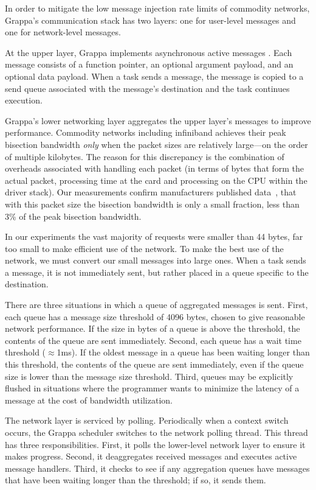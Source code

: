 In order to mitigate the low message injection rate limits of commodity networks, Grappa's communication stack has two layers: one for user-level messages and one for network-level messages.

At the upper layer, Grappa implements asynchronous active messages \cite{vonEicken92}. Each message consists of a function pointer, an optional argument payload, and an optional data payload. When a task sends a message, the message is copied to a send queue associated with the message's destination and the task continues execution.

Grappa's lower networking layer aggregates the upper layer's messages to improve performance. Commodity networks including infiniband achieves their peak bisection bandwidth \emph{only} when the packet sizes are relatively large---on the order of multiple kilobytes. The reason for this discrepancy is the combination of overheads associated with handling each packet (in terms of bytes that form the actual packet, processing time at the card and processing on the CPU within the driver stack). Our measurements confirm manufacturers published data~\cite{infinibandbandwidth}, that with this packet size the bisection bandwidth is only a small fraction, less than 3\% of the peak bisection bandwidth.

In our experiments the vast majority of requests were smaller than 44 bytes, far too small to make efficient use of the network. To make the best use of the network, we must convert our small messages into large ones. When a task sends a message, it is not immediately sent, but rather placed in a queue specific to the destination.

There are three situations in which a queue of aggregated messages is sent. First, each queue has a message size threshold of 4096 bytes, chosen to give reasonable network performance. If the size in bytes of a queue is above the threshold, the contents of the queue are sent immediately. Second, each queue has a wait time threshold ($\approx${1ms}). If the oldest message in a queue has been waiting longer than this threshold, the contents of the queue are sent immediately, even if the queue size is lower than the message size threshold.  Third, queues may be explicitly flushed in situations where the programmer wants to minimize the latency of a message at the cost of bandwidth utilization.

The network layer is serviced by polling. Periodically when a context switch occurs, the Grappa scheduler switches to the network polling thread. This thread has three responsibilities. First, it polls the lower-level network layer to ensure it makes progress. Second, it deaggregates received messages and executes active message handlers. Third, it checks to see if any aggregation queues have messages that have been waiting longer than the threshold; if so, it sends them.


